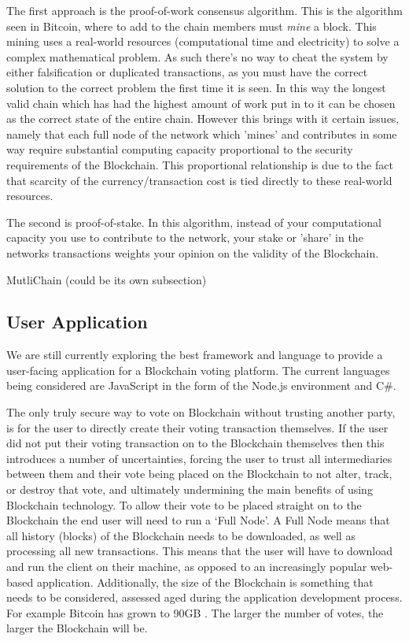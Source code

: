 \documentclass{article}
\begin{document}
The first approach is the proof-of-work consensus algorithm. This is the algorithm seen in Bitcoin, where to add to the chain members must \emph{mine} a block. This mining uses a real-world resources (computational time and electricity) to solve a complex mathematical problem. As such there's no way to cheat the system by either falsification or duplicated transactions, as you must have the correct solution to the correct problem the first time it is seen. In this way the longest valid chain which has had the highest amount of work put in to it can be chosen as the correct state of the entire chain. However this brings with it certain issues, namely that each full node of the network which 'mines' and contributes in some way require substantial computing capacity proportional to the security requirements of the Blockchain. This proportional relationship is due to the fact that scarcity of the currency/transaction cost is tied directly to these real-world resources.

\par

The second is proof-of-stake. In this algorithm, instead of your computational capacity you use to contribute to the network, your stake or 'share' in the networks transactions weights your opinion on the validity of the Blockchain.

\par

MutliChain (could be its own subsection)

\subsection{User Application}

We are still currently exploring the best framework and language to provide a user-facing application for a Blockchain voting platform. The current languages being considered are JavaScript in the form of the Node.js environment and C\#.

\par

The only truly secure way to vote on Blockchain without trusting another party, is for the user to directly create their voting transaction themselves. If the user did not put their voting transaction on to the Blockchain themselves then this introduces a number of uncertainties, forcing the user to trust all intermediaries between them and their vote being placed on the Blockchain to not alter, track, or destroy that vote, and ultimately undermining the main benefits of using Blockchain technology. To allow their vote to be placed straight on to the Blockchain the end user will need to run a `Full Node'. A Full Node means that all history (blocks) of the Blockchain needs to be downloaded, as well as processing all new transactions. This means that the user will have to download and run the client on their machine, as opposed to an increasingly popular web-based application. Additionally, the size of the Blockchain is something that needs to be considered, assessed aged during the application development process. For example Bitcoin has grown to 90GB \parencite{blockchaininfosize}. The larger the number of votes, the larger the Blockchain will be.
\end{document}
